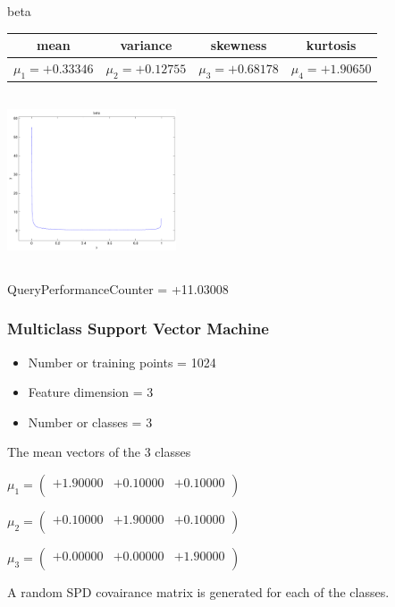\documentclass[9pt]{article}
\theoremstyle{plain}
\theoremstyle{definition}
\theoremstyle{remark}
\numberwithin{equation}{section}
\begin{document}
\newpage
beta \begin{tabular}{|c|c|c|c|}  mean & variance & skewness & kurtosis \\  \hline
$\mu_1 = +0.33346$ & $\mu_2 = +0.12755$ & $\mu_3 = +0.68178$ & $\mu_4 =+1.90650$ \\
\end{tabular}

\includegraphics[width=5cm,height=5cm]{beta.pdf}

QueryPerformanceCounter  =  +11.03008
\subsubsection{Multiclass Support Vector Machine }
\begin{itemize}
\item Number or training points = 1024
\item Feature dimension = 3
\item Number or classes = 3
\end{itemize}
{The mean vectors of the 3 classes}

$\mu_1 = \left(
\begin{array}{
ccc}
+1.90000 & +0.10000 & +0.10000 \\
\end{array}
\right)$ \newline 

$\mu_2 = \left(
\begin{array}{
ccc}
+0.10000 & +1.90000 & +0.10000 \\
\end{array}
\right)$ \newline 

$\mu_3 = \left(
\begin{array}{
ccc}
+0.00000 & +0.00000 & +1.90000 \\
\end{array}
\right)$ \newline 

A random SPD covairance matrix is generated for each of the classes.\newline
\end{document}
